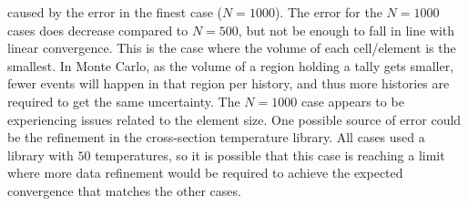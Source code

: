 \documentclass[letterpaper]{mc2023}
\begin{document}
caused by the error in the finest case ($N=1000$). The error for the $N=1000$ cases does decrease compared to $N=500$, but not be enough to fall in
line with linear convergence. This is the case where the volume of each cell/element is the smallest. In Monte Carlo, as the volume of a region holding
a tally gets smaller, fewer events will happen in that region per history, and thus more histories are required to get the same uncertainty. The
$N=1000$ case appears to be experiencing issues related to the element size. One possible source of error could be the refinement in the cross-section
temperature library. All cases used a library with $50$ temperatures, so it is possible that this case is reaching a limit where more data refinement
would be required to achieve the expected convergence that matches the other cases.
\end{document}
